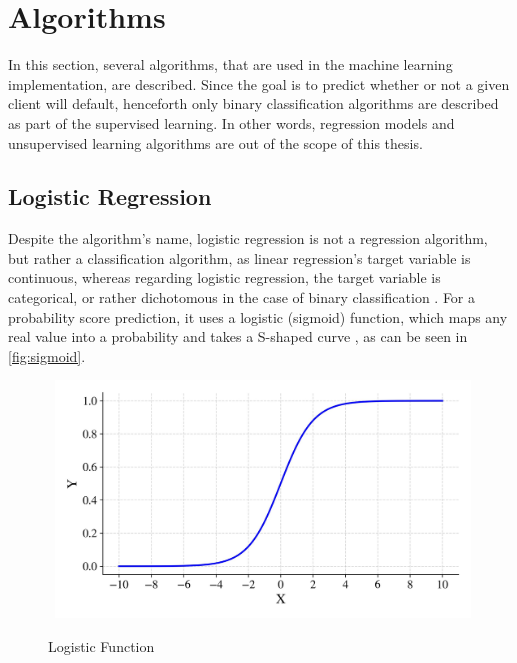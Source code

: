 \section{Algorithms}
\label{sec:algorithms}

In this section, several algorithms, that are used in the machine learning implementation, are described.
Since the goal is to predict whether or not a given client will default, henceforth only binary classification algorithms are described as part of the supervised learning. In other words, regression models and unsupervised learning algorithms are out of the scope of this thesis.
\subsection{Logistic Regression}
\label{subsubsec:logisticregression}
Despite the algorithm's name, logistic regression is not a regression algorithm, but rather a classification algorithm, as linear regression's target variable is continuous, whereas regarding logistic regression, the target variable is categorical, or rather dichotomous in the case of binary classification \citep{wendler2021data}.
For a probability score prediction, it uses a logistic (sigmoid) function, which maps any real value into a probability and takes a S-shaped curve \citep{zaidi2022mathematical}, as can be seen in \autoref{fig:sigmoid}.

\begin{figure}[H]
    \centering
    \caption{Logistic Function}\vspace{0.5em}
    \label{fig:sigmoid}\
    \includegraphics[width=110mm]{Figures/sigmoid.jpg}

    \vspace{-1em}
\end{figure}

